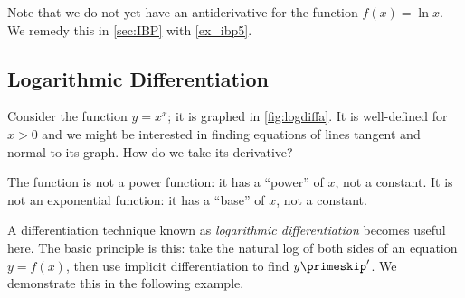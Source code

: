 Note that we do not yet have an antiderivative for the function $f(x)=\ln x$. We remedy this in \autoref{sec:IBP} with \autoref{ex_ibp5}.

%
%

\subsection{Logarithmic Differentiation}


Consider the function $y=x^x$; it is graphed in \autoref{fig:logdiffa}. It is well-defined for $x>0$ and we might be interested in finding equations of lines tangent and normal to its graph. How do we take its derivative?

The function is not a power function: it has a ``power'' of $x$, not a constant. It is not an exponential function: it has a ``base'' of $x$, not a constant. 

A differentiation technique known as \emph{logarithmic differentiation} becomes useful here. The basic principle is this: take the natural log of both sides of an equation $y=f(x)$, then use implicit differentiation to find $y\primeskip'$. We demonstrate this in the following example.

